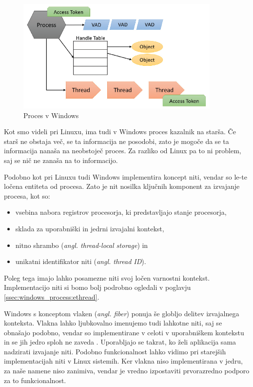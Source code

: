 \documentclass[a4paper,12pt,openright]{book}
\begin{document}
\begin{figure}[h!]
	\begin{center}
		\includegraphics[width=0.9\textwidth]{images/windows_process.png}
	\end{center}
	\caption{Proces v Windows \cite{Yosifovich_Russinovich_Solomon_Ionescu_2017}}
	\label{fig:windows_process}
\end{figure}

Kot smo videli pri Linuxu, ima tudi v Windows proces kazalnik na starša.
Če starš ne obstaja več, se ta informacija ne posodobi, zato je mogoče da se ta informacija nanaša na neobstoječ proces.
Za razliko od Linux pa to ni problem, saj se nič ne zanaša na to informacijo.

Podobno kot pri Linuxu tudi Windows implementira koncept niti, vendar so le-te ločena entiteta od procesa.
Zato je nit nosilka ključnih komponent za izvajanje procesa, kot so:
\begin{itemize}
	\item vsebina nabora registrov procesorja, ki predstavljajo stanje procesorja,
	\item sklada za uporabniški in jedrni izvajalni kontekst,
	\item nitno shrambo (\textit{angl. thread-local storage}) in
	\item unikatni identifikator niti (\textit{angl. thread ID}).
\end{itemize}
Poleg tega imajo lahko posamezne niti svoj ločen varnostni kontekst.
Implementacijo niti si bomo bolj podrobno ogledali v poglavju \ref{ssec:windows_process:ethread}.

Windows s konceptom vlaken (\textit{angl. fiber}) ponuja še globljo delitev izvajalnega konteksta.
Vlakna lahko ljubkovalno imenujemo tudi lahkotne niti, saj se obnašajo podobno, vendar so implementirane v celoti v uporabniškem kontekstu in se jih jedro sploh ne zaveda \cite{Yosifovich_Russinovich_Solomon_Ionescu_2017}.
Uporabljajo se takrat, ko želi aplikacija sama nadzirati izvajanje niti.
Podobno funkcionalnost lahko vidimo pri starejših implementacijah niti v Linux sistemih.
Ker vlakna niso implementirana v jedru, za naše namene niso zanimiva, vendar je vredno izpostaviti prvorazredno podporo za to funkcionalnost.
\end{document}
